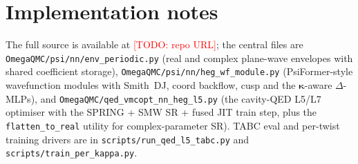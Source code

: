 \documentclass[reprint,amsmath,amssymb,aps,prb,floatfix,nofootinbib]{revtex4-2}
\newcommand{\todo}[1]{\textcolor{red}{[TODO: #1]}}
\begin{document}
\section{Implementation notes}\label{app:impl}
The full source is available at \todo{repo URL}; the central files
are
\texttt{OmegaQMC/psi/nn/env\_periodic.py} (real and complex
plane-wave envelopes with shared coefficient storage),
\texttt{OmegaQMC/psi/nn/heg\_wf\_module.py} (PsiFormer-style
wavefunction modules with Smith~DJ, coord backflow, cusp and the
$\bm\kappa$-aware $\Delta$-MLPs), and
\texttt{OmegaQMC/qed\_vmcopt\_nn\_heg\_l5.py} (the cavity-QED L5/L7
optimiser with the SPRING + SMW SR + fused JIT train step, plus
the \texttt{flatten\_to\_real} utility for complex-parameter SR).
TABC eval and per-twist training drivers are in
\texttt{scripts/run\_qed\_l5\_tabc.py} and
\texttt{scripts/train\_per\_kappa.py}.
\end{document}
